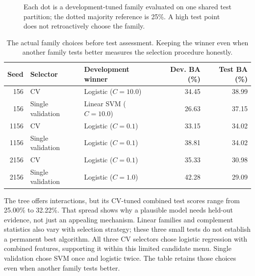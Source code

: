\documentclass[11pt,letterpaper]{article}
\begin{document}
\begin{figure}[htbp]\centering
{}
\caption{Each dot is a development-tuned family evaluated on one shared test partition; the dotted majority reference is 25\%. A high test point does not retroactively choose the family.}\label{fig:families}\end{figure}

\begin{table}[htbp]\centering\small
\begin{tabular}{@{}rllrr@{}}\toprule
Seed &Selector &Development winner &Dev. BA (\%) &Test BA (\%)\\\midrule
156&CV&Logistic ($C=10.0$)&34.45&38.99\\
156&Single validation&Linear SVM ($C=10.0$)&26.63&37.15\\
1156&CV&Logistic ($C=0.1$)&33.15&34.02\\
1156&Single validation&Logistic ($C=0.1$)&38.81&34.02\\
2156&CV&Logistic ($C=0.1$)&35.33&30.98\\
2156&Single validation&Logistic ($C=1.0$)&42.28&29.09\\
\bottomrule\end{tabular}
\caption{The actual family choices before test assessment. Keeping the winner even when another family tests better measures the selection procedure honestly.}\label{tab:winners}\end{table}

The tree offers interactions, but its CV-tuned combined test scores range from 25.00\% to 32.22\%. That spread shows why a plausible model needs held-out evidence, not just an appealing mechanism. Linear families and complement statistics also vary with selection strategy; these three small tests do not establish a permanent best algorithm. All three CV selectors chose logistic regression with combined features, supporting it within this limited candidate menu. Single validation chose SVM once and logistic twice. The table retains those choices even when another family tests better.
\end{document}
